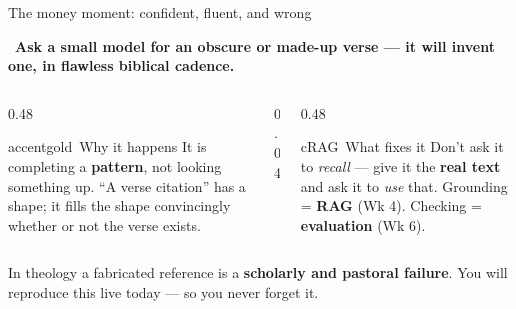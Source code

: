 \begin{frame}{The money moment: confident, fluent, and wrong}
  \vspace{2pt}
  \begin{calloutbox}[accentgold]
    \large\faExclamationTriangle\ \textbf{Ask a small model for an obscure or
    made-up verse --- it will invent one, in flawless biblical cadence.}
  \end{calloutbox}
  \vspace{10pt}
  \begin{columns}[t, totalwidth=\textwidth]
    \begin{column}{0.48\textwidth}
      \begin{featbox}{accentgold}{\faQuestionCircle\ Why it happens}
        \scriptsize It is completing a \textbf{pattern}, not looking something up.
        ``A verse citation'' has a shape; it fills the shape convincingly whether or
        not the verse exists.
      \end{featbox}
    \end{column}
    \begin{column}{0.04\textwidth}\end{column}
    \begin{column}{0.48\textwidth}
      \begin{featbox}{cRAG}{\faUserShield\ What fixes it}
        \scriptsize Don't ask it to \emph{recall} --- give it the \textbf{real text}
        and ask it to \emph{use} that. Grounding = \textbf{RAG} (Wk 4). Checking =
        \textbf{evaluation} (Wk 6).
      \end{featbox}
    \end{column}
  \end{columns}
  \vspace{8pt}
  \begin{center}\small\color{labnavy}%
    In theology a fabricated reference is a \textbf{scholarly and pastoral failure}. You will reproduce this live today --- so you never forget it.\end{center}
\end{frame}


